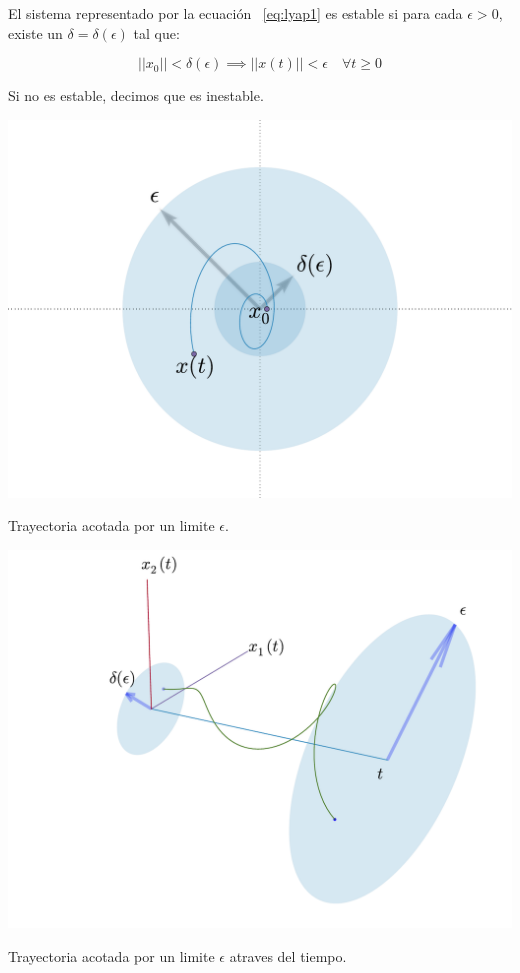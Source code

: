         \begin{definicion}
            El sistema representado por la ecuación ~\ref{eq:lyap1} es estable si para cada $\epsilon > 0$, existe un $\delta = \delta(\epsilon)$ tal que:

            \begin{equation*}
                ||x_0|| < \delta(\epsilon) \implies  ||x(t)||  < \epsilon \quad \forall t \ge 0
            \end{equation*}

            Si no es estable, decimos que es inestable.

            \begin{marginfigure}
                \centering
                \includegraphics[width=\textwidth]{./imagenes/trayectoriaacotada.pdf}
                \caption{\label{fig:trayectoriaestable}Trayectoria acotada por un limite $\epsilon$.}
            \end{marginfigure}

            \begin{marginfigure}
                \centering
                \includegraphics[width=\textwidth]{./imagenes/trayectoriaacotada3d.pdf}
                \caption{\label{fig:trayectoriaestable3d}Trayectoria acotada por un limite $\epsilon$ atraves del tiempo.}
            \end{marginfigure}


\end{definicion}

